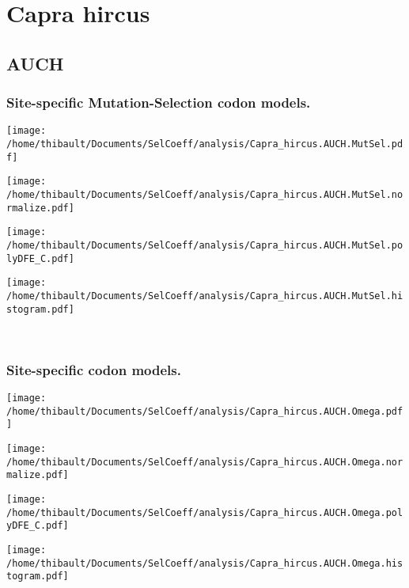 \section{Capra hircus} 
 
\subsection{AUCH} 
 
\subsubsection*{Site-specific Mutation-Selection codon models.} 
\begin{minipage}{0.49\linewidth} 
\texttt{[image: /home/thibault/Documents/SelCoeff/analysis/Capra\_hircus.AUCH.MutSel.pdf]} 
\end{minipage}
\begin{minipage}{0.49\linewidth} 
\texttt{[image: /home/thibault/Documents/SelCoeff/analysis/Capra\_hircus.AUCH.MutSel.normalize.pdf]} 
\end{minipage}
\begin{minipage}{0.49\linewidth} 
\texttt{[image: /home/thibault/Documents/SelCoeff/analysis/Capra\_hircus.AUCH.MutSel.polyDFE\_C.pdf]} 
\end{minipage}
\begin{minipage}{0.49\linewidth} 
\texttt{[image: /home/thibault/Documents/SelCoeff/analysis/Capra\_hircus.AUCH.MutSel.histogram.pdf]} 
\end{minipage}
\\ 
\subsubsection*{Site-specific codon models.} 
\begin{minipage}{0.49\linewidth} 
\texttt{[image: /home/thibault/Documents/SelCoeff/analysis/Capra\_hircus.AUCH.Omega.pdf]} 
\end{minipage}
\begin{minipage}{0.49\linewidth} 
\texttt{[image: /home/thibault/Documents/SelCoeff/analysis/Capra\_hircus.AUCH.Omega.normalize.pdf]} 
\end{minipage}
\begin{minipage}{0.49\linewidth} 
\texttt{[image: /home/thibault/Documents/SelCoeff/analysis/Capra\_hircus.AUCH.Omega.polyDFE\_C.pdf]} 
\end{minipage}
\begin{minipage}{0.49\linewidth} 
\texttt{[image: /home/thibault/Documents/SelCoeff/analysis/Capra\_hircus.AUCH.Omega.histogram.pdf]} 
\end{minipage}
\\ 

